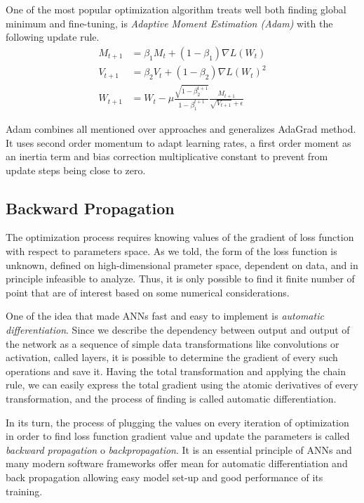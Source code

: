 One of the most popular optimization algorithm treats well both finding global minimum and fine-tuning, is \emph{Adaptive Moment Estimation (Adam)} with the following update rule.
\begin{align*}
	M_{t+1} & = \beta_{1}M_{t} + (1-\beta_{1})\nabla L(W_{t}) \\
	V_{t+1} & = \beta_{2} V_{t} + (1-\beta_{2})\nabla L(W_{t})^2 \\
	W_{t+1} & = W_{t} - \mu \frac{\sqrt{1-\beta_{2}^{t+1}}}{1-\beta_{1}^{t+1}} \frac{M_{t+1}}{\sqrt{V_{t+1}}+\epsilon}
\end{align*}		

Adam combines all mentioned over approaches and generalizes AdaGrad method.
It uses second order momentum to adapt learning rates, a first order moment as an inertia term and bias correction multiplicative constant to prevent from update steps being close to zero.

\subsection{Backward Propagation}

The optimization process requires knowing values of the gradient of loss function with respect to parameters space.
As we told, the form of the loss function is unknown, defined on high-dimensional prameter space, dependent on data, and in principle infeasible to analyze.
Thus, it is only possible to find it finite number of point that are of interest based on some numerical considerations.

\medskip
One of the idea that made ANNs fast and easy to implement is \emph{automatic differentiation}.
Since we describe the dependency between output and output of the network as a sequence of simple data transformations like convolutions or activation, called layers, it is possible to determine the gradient of every such operations and save it.
Having the total transformation and applying the chain rule, we can easily express the total gradient using the atomic derivatives of every transformation, and the process of finding is called automatic differentiation. 

\medskip
In its turn, the process of plugging the values on every iteration of optimization in order to find loss function gradient value and update the parameters is called \textit{backward propagation} o \emph{backpropagation}.
It is an essential principle of ANNs and many modern software frameworks offer mean for automatic differentiation and back propagation allowing easy model set-up and good performance of its training\cite{}.


